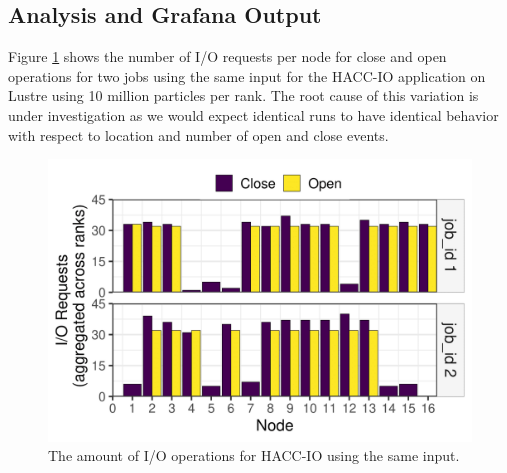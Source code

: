 \subsection{Analysis and Grafana Output}
Figure \ref{f:hacc2} shows the number of I/O requests per node for close and 
open operations for two jobs using the same input for the HACC-IO application 
on Lustre using 10 million particles per rank. The root cause of this variation 
is under investigation as we would expect identical runs to have identical
behavior with respect to location and number of open and close events.


\begin{figure}
	\centering
        \includegraphics[width=\linewidth]{figs/hacc_nfs_10.png}
	\caption{The amount of I/O operations for HACC-IO using the same input.}
	\label{f:hacc2}
\end{figure}

